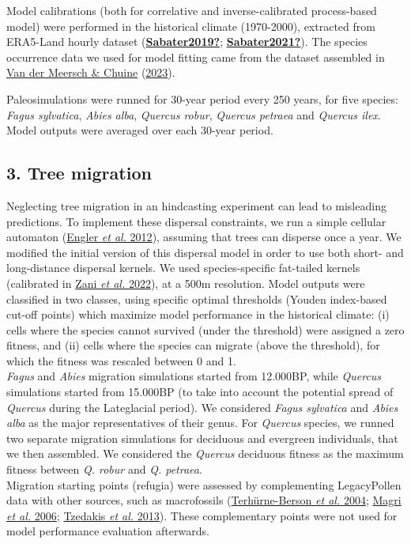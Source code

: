 \documentclass[11pt,]{article}
\begin{document}
Model calibrations (both for correlative and inverse-calibrated
process-based model) were performed in the historical climate
(1970-2000), extracted from ERA5-Land hourly dataset
(\protect\hyperlink{ref-Sabater2019}{\textbf{Sabater2019?}};
\protect\hyperlink{ref-Sabater2021}{\textbf{Sabater2021?}}). The species
occurrence data we used for model fitting came from the dataset
assembled in \protect\hyperlink{ref-VanderMeersch2023}{Van der Meersch
\& Chuine} (\protect\hyperlink{ref-VanderMeersch2023}{2023}).

Paleosimulations were runned for 30-year period every 250 years, for
five species: \emph{Fagus sylvatica}, \emph{Abies alba}, \emph{Quercus
robur}, \emph{Quercus petraea} and \emph{Quercus ilex}. Model outputs
were averaged over each 30-year period.

\hypertarget{tree-migration}{%
\subsection{3. Tree migration}\label{tree-migration}}

Neglecting tree migration in an hindcasting experiment can lead to
misleading predictions. To implement these dispersal constraints, we run
a simple cellular automaton (\protect\hyperlink{ref-Engler2012}{Engler
\emph{et al.} 2012}), assuming that trees can disperse once a year. We
modified the initial version of this dispersal model in order to use
both short- and long-distance dispersal kernels. We used
species-specific fat-tailed kernels (calibrated in
\protect\hyperlink{ref-Zani2022}{Zani \emph{et al.} 2022}), at a 500m
resolution. Model outputs were classified in two classes, using specific
optimal thresholds (Youden index-based cut-off points) which maximize
model performance in the historical climate: (i) cells where the species
cannot survived (under the threshold) were assigned a zero fitness, and
(ii) cells where the species can migrate (above the threshold), for
which the fitness was rescaled between 0 and 1.\\
\emph{Fagus} and \emph{Abies} migration simulations started from
12.000BP, while \emph{Quercus} simulations started from 15.000BP (to
take into account the potential spread of \emph{Quercus} during the
Lateglacial period). We considered \emph{Fagus sylvatica} and
\emph{Abies alba} as the major representatives of their genus. For
\emph{Quercus} species, we runned two separate migration simulations for
deciduous and evergreen individuals, that we then assembled. We
considered the \emph{Quercus} deciduous fitness as the maximum fitness
between \emph{Q. robur} and \emph{Q. petraea}.\\
Migration starting points (refugia) were assessed by complementing
LegacyPollen data with other sources, such as macrofossils
(\protect\hyperlink{ref-TerhuerneBerson2004}{Terhürne-Berson \emph{et
al.} 2004}; \protect\hyperlink{ref-Magri2006}{Magri \emph{et al.} 2006};
\protect\hyperlink{ref-Tzedakis2013}{Tzedakis \emph{et al.} 2013}).
These complementary points were not used for model performance
evaluation afterwards.
\end{document}

